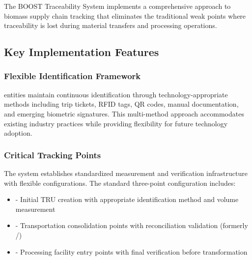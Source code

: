 
The BOOST Traceability System implements a comprehensive approach to biomass supply chain tracking that eliminates the traditional weak points where traceability is lost during material transfers and processing operations.

\subsection{Key Implementation Features}
\label{sec:key-implementation-features}

\subsubsection{Flexible Identification Framework}
\label{sec:traceability-continuous-framework}

\begin{important}[title=Comprehensive Traceability Approach]
\TRU{} entities maintain continuous identification through technology-appropriate methods including trip tickets, RFID tags, QR codes, manual documentation, and emerging biometric signatures. This multi-method approach accommodates existing industry practices while providing flexibility for future technology adoption.
\end{important}

\subsubsection{Critical Tracking Points}
\label{sec:critical-tracking-points}

The system establishes standardized measurement and verification infrastructure with flexible configurations. The standard three-point configuration includes:

\begin{itemize}
    \item \textbf{} - Initial TRU creation with appropriate identification method and volume measurement
    \item \textbf{} - Transportation consolidation points with reconciliation validation (formerly /)
    \item \textbf{} - Processing facility entry points with final verification before transformation
\end{itemize}

